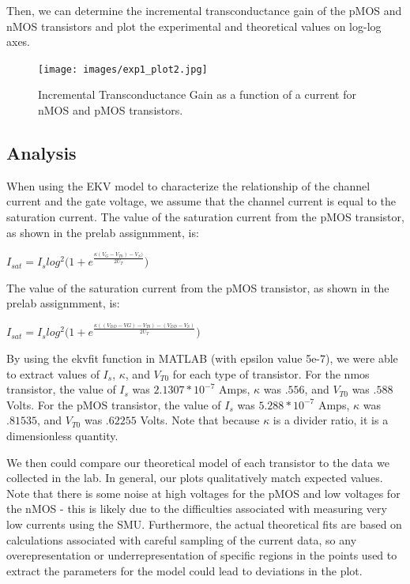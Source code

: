 \documentclass{article}
\begin{document}
Then, we can determine the incremental transconductance gain of the pMOS and nMOS transistors and plot the experimental and theoretical values on log-log axes.
\begin{figure}[H]   
  \begin{center}       
  \texttt{[image: images/exp1\_plot2.jpg]}
  \caption{Incremental Transconductance Gain as a function of a current for nMOS and pMOS transistors.}
  \label{fig:exp1_plot1}
  \end{center}
\end{figure}

\subsection{Analysis}
When using the EKV model to characterize the relationship of the channel current and the gate voltage, we assume that the channel current is equal to the saturation current. The value of the saturation current from the pMOS transistor, as shown in the prelab assignmment, is: 
\begin{center}
 $I_{sat} = I_{s}log^{2}{(1 + e^{\frac{\kappa(V_G - V_{T0}) - V_S)}{2U_T}}})$
\end{center}

\noindent The value of the saturation current from the pMOS transistor, as shown in the prelab assignmment, is: 
\begin{center}
 $I_{sat} = I_{s}log^{2}{(1 + e^{\frac{\kappa((V_{DD} - VG) - V_{T0}) - (V_{DD} - V_S)}{2U_T}}})$
\end{center}

By using the ekvfit function in MATLAB (with epsilon value 5e-7), we were able to extract values of $I_s$, $\kappa$, and $V_{T0}$ for each type of transistor. For the nmos transistor, the value of $I_s$ was $2.1307*10^{-7}$ Amps, $\kappa$ was $.556$, and $V_{T0}$ was $.588$ Volts. For the pMOS transistor, the value of $I_s$ was $5.288*10^{-7}$ Amps, $\kappa$ was $.81535$, and $V_{T0}$ was $.62255$ Volts. Note that because $\kappa$ is a divider ratio, it is a dimensionless quantity.

We then could compare our theoretical model of each transistor to the data we collected in the lab. In general, our plots qualitatively match expected  values. Note that there is some noise at high voltages for the pMOS and low voltages for the nMOS - this is likely due to the difficulties associated with measuring very low currents using the SMU. Furthermore, the actual theoretical fits are based on calculations associated with careful sampling of the current data, so any overepresentation or underrepresentation of specific regions in the points used to extract the parameters for the model could lead to deviations in the plot.
\end{document}
